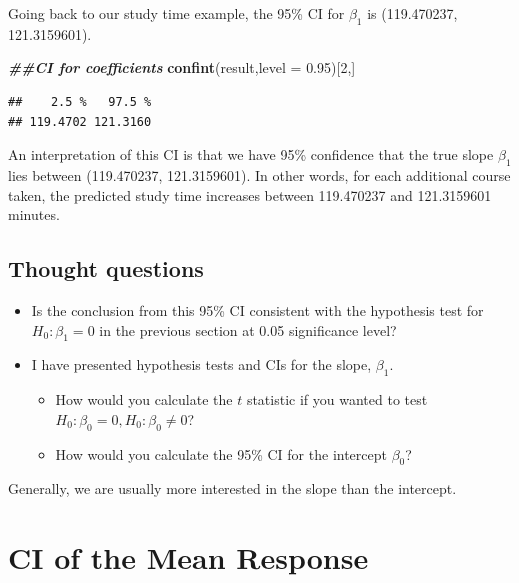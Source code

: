 \documentclass[
]{book}
\newenvironment{Shaded}{\begin{snugshade}}{\end{snugshade}}
\newcommand{\AttributeTok}[1]{\textcolor[rgb]{0.13,0.29,0.53}{#1}}
\newcommand{\DecValTok}[1]{\textcolor[rgb]{0.00,0.00,0.81}{#1}}
\newcommand{\DocumentationTok}[1]{\textcolor[rgb]{0.56,0.35,0.01}{\textbf{\textit{#1}}}}
\newcommand{\FloatTok}[1]{\textcolor[rgb]{0.00,0.00,0.81}{#1}}
\newcommand{\FunctionTok}[1]{\textcolor[rgb]{0.13,0.29,0.53}{\textbf{#1}}}
\newcommand{\NormalTok}[1]{#1}
\begin{document}
Going back to our study time example, the 95\% CI for \(\beta_1\) is (119.470237, 121.3159601).

\begin{Shaded}
\begin{Highlighting}[]
\DocumentationTok{\#\#CI for coefficients}
\FunctionTok{confint}\NormalTok{(result,}\AttributeTok{level =} \FloatTok{0.95}\NormalTok{)[}\DecValTok{2}\NormalTok{,]}
\end{Highlighting}
\end{Shaded}

\begin{verbatim}
##    2.5 %   97.5 % 
## 119.4702 121.3160
\end{verbatim}

An interpretation of this CI is that we have 95\% confidence that the true slope \(\beta_1\) lies between (119.470237, 121.3159601). In other words, for each additional course taken, the predicted study time increases between 119.470237 and 121.3159601 minutes.

\hypertarget{thought-questions}{%
\subsection{Thought questions}\label{thought-questions}}

\begin{itemize}
\item
  Is the conclusion from this 95\% CI consistent with the hypothesis test for \(H_0: \beta_1 = 0\) in the previous section at 0.05 significance level?
\item
  I have presented hypothesis tests and CIs for the slope, \(\beta_1\).

  \begin{itemize}
  \item
    How would you calculate the \(t\) statistic if you wanted to test \(H_0: \beta_0 = 0, H_0: \beta_0 \neq 0\)?
  \item
    How would you calculate the 95\% CI for the intercept \(\beta_0\)?
  \end{itemize}
\end{itemize}

Generally, we are usually more interested in the slope than the intercept.

\hypertarget{ci-of-the-mean-response}{%
\section{CI of the Mean Response}\label{ci-of-the-mean-response}}
\end{document}
